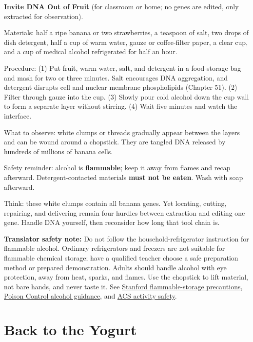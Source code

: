 \begin{shiyan}
\textbf{Invite DNA Out of Fruit} (for classroom or home; no genes are edited, only extracted for observation).

Materials: half a ripe banana or two strawberries, a teaspoon of salt, two drops of dish detergent, half a cup of warm water, gauze or coffee-filter paper, a clear cup, and a cup of medical alcohol refrigerated for half an hour.

Procedure: (1) Put fruit, warm water, salt, and detergent in a food-storage bag and mash for two or three minutes. Salt encourages DNA aggregation, and detergent disrupts cell and nuclear membrane phospholipids (Chapter 51). (2) Filter through gauze into the cup. (3) Slowly pour cold alcohol down the cup wall to form a separate layer without stirring. (4) Wait five minutes and watch the interface.

What to observe: white clumps or threads gradually appear between the layers and can be wound around a chopstick. They are tangled DNA released by hundreds of millions of banana cells.

Safety reminder: alcohol is \textbf{flammable}; keep it away from flames and recap afterward. Detergent-contacted materials \textbf{must not be eaten}. Wash with soap afterward.

Think: these white clumps contain all banana genes. Yet locating, cutting, repairing, and delivering remain four hurdles between extraction and editing one gene. Handle DNA yourself, then reconsider how long that tool chain is.
\end{shiyan}

\textbf{Translator safety note:} Do not follow the household-refrigerator instruction for flammable alcohol. Ordinary refrigerators and freezers are not suitable for flammable chemical storage; have a qualified teacher choose a safe preparation method or prepared demonstration. Adults should handle alcohol with eye protection, away from heat, sparks, and flames. Use the chopstick to lift material, not bare hands, and never taste it. See \href{https://ehs.stanford.edu/wp-content/uploads/Lab-Compliance-Cheat-Sheet.pdf}{Stanford flammable-storage precautions}, \href{https://www.poison.org/articles/rubbing-alcohol-only-looks-like-water}{Poison Control alcohol guidance}, and \href{https://www.acs.org/education/celebrating-chemistry-editions/2024-ccew/science-safety-tips.html}{ACS activity safety}.

\section{Back to the Yogurt}

